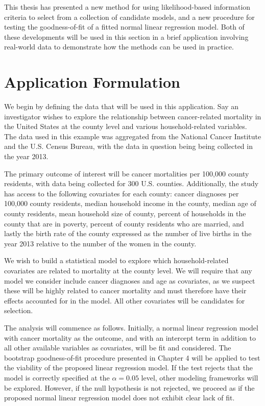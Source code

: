 \doublespace
{}

		This thesis has presented a new method for using likelihood-based information criteria to select from a collection of candidate models, and a new procedure
		for testing the goodness-of-fit of a fitted normal linear regression model. Both of these developments will be used in this section in a brief application
		involving real-world data to demonstrate how the methods can be used in practice.

		\section{Application Formulation} \label{sec:app_form}

		We begin by defining the data that will be used in this application. Say an investigator wishes to explore the relationship between cancer-related mortality in
		the United States at the county level and various household-related variables. The data used in this example was aggregated from the National Cancer Institute
		and the U.S. Census Bureau, with the data in question being being collected in the year 2013.
		
		The primary outcome of interest will be cancer mortalities per 100,000 county residents, with data being collected for 300 U.S. counties. Additionally, the study has access to the
		following covariates for each county: cancer diagnoses per 100,000 county residents, median household income in the county, median age of county residents, mean
		household size of county, percent of households in the county that are in poverty, percent of county residents who are married, and lastly the birth rate of the county expressed
		as the number of live births in the year 2013 relative to the number of the women in the county.

		We wish to build a statistical model to explore which household-related covariates are related to mortality at the county level. We will require that any model we
		consider include cancer diagnoses and age as covariates, as we suspect these will be highly related to cancer mortality and must therefore have their effects
		accounted for in the model. All other covariates will be candidates for selection.

		The analysis will commence as follows. Initially, a normal linear regression model with cancer mortality as the outcome, and with an intercept term in addition to all
		other available variables as covariates, will be fit and considered. The bootstrap goodness-of-fit procedure presented in Chapter 4 will be applied to test the 
		viability of the proposed linear regression model. If the test rejects that the model is correctly specified at the $\alpha = 0.05$ level, other modeling frameworks
		will be explored. However, if the null hypothesis is not rejected, we proceed as if the proposed normal linear regression model does not exhibit clear lack of fit.

